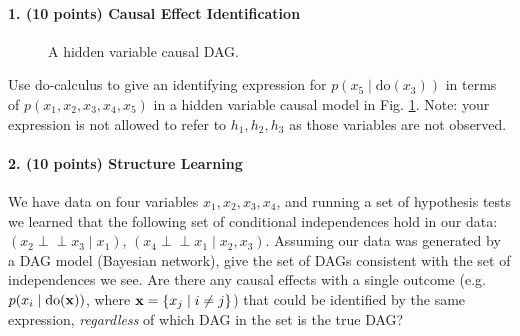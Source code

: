 \documentclass[11pt]{article}
\def\ci{\perp\!\!\!\perp}
\begin{document}
\newcommand{\Dirichlet}[1]{\operatorname{Dirichlet}(#1)}
\newcommand{\Multinomial}[1]{\operatorname{Multinomial}(#1)}

\paragraph{1. (10 points) Causal Effect Identification}

\begin{figure}
\begin{center}
\end{center}
\caption{ A hidden variable causal DAG.
}
\label{fig:simple}
\end{figure}

Use do-calculus to give an identifying expression for
$p(x_5 \mid \text{do}(x_3))$ in terms of $p(x_1,x_2,x_3,x_4,x_5)$
in a hidden variable causal model in Fig. \ref{fig:simple}.  Note: your expression is not allowed
to refer to $h_1,h_2,h_3$ as those variables are not observed.


\paragraph{2. (10 points) Structure Learning}

We have data on four variables $x_1, x_2, x_3, x_4$, and running a set of
hypothesis tests we learned that the following set of conditional
independences hold in our data:
$(x_2 \ci x_3 \mid x_1)$, $(x_4 \ci x_1 \mid x_2, x_3)$.  Assuming our data was
generated by a DAG model (Bayesian network), give the set of DAGs consistent
with the set of independences we see.  Are there any causal effects with a single outcome (e.g. $p(x_i \mid \text{do}({\bf x}))$, where ${\bf x} = \{ x_j \mid i \neq j \}$) that could be
identified by the same expression, \emph{regardless} of which DAG in the set is
the true DAG?
\end{document}
